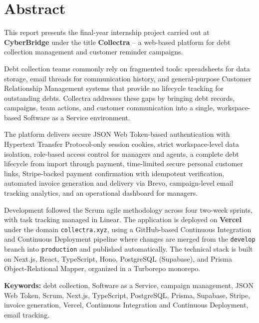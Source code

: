 \documentclass[12pt,a4paper]{report}
\begin{document}
\clearpage


\chapter*{Abstract}
{}

This report presents the final-year internship project carried out at
\textbf{CyberBridge } under the title \textbf{Collectra} --
a web-based platform for debt collection management and customer reminder campaigns.

Debt collection teams commonly rely on fragmented tools: spreadsheets for data
storage, email threads for communication history, and general-purpose Customer Relationship Management systems
that provide no lifecycle tracking for outstanding debts.
Collectra addresses these gaps by bringing debt records, campaigns, team actions,
and customer communication into a single, workspace-based Software as a Service environment.

The platform delivers secure JSON Web Token-based authentication with Hypertext Transfer Protocol-only
session cookies,
strict workspace-level data isolation, role-based access control for managers and
agents, a complete debt lifecycle from import through payment, time-limited secure
personal customer links, Stripe-backed payment confirmation with idempotent
verification, automated invoice generation and delivery via Brevo, campaign-level
email tracking analytics, and an operational dashboard for managers.

Development followed the Scrum agile methodology across four two-week sprints, with
task tracking managed in Linear.
The application is deployed on \textbf{Vercel} under the domain
\texttt{collectra.xyz}, using a GitHub-based Continuous Integration and Continuous Deployment pipeline where changes are
merged from the \texttt{develop} branch into \texttt{production} and published
automatically.
The technical stack is built on Next.js, React, TypeScript, Hono, PostgreSQL
(Supabase), and Prisma Object-Relational Mapper, organized in a Turborepo monorepo.

\medskip
\noindent{\color{accentblue}\rule{2.8cm}{0.55pt}}\par\vspace{0.35em}
\noindent\textbf{Keywords:}
debt collection, Software as a Service, campaign management, JSON Web Token, Scrum, Next.js,
TypeScript, PostgreSQL, Prisma, Supabase, Stripe, invoice generation, Vercel,
Continuous Integration and Continuous Deployment, email tracking.
\end{document}
